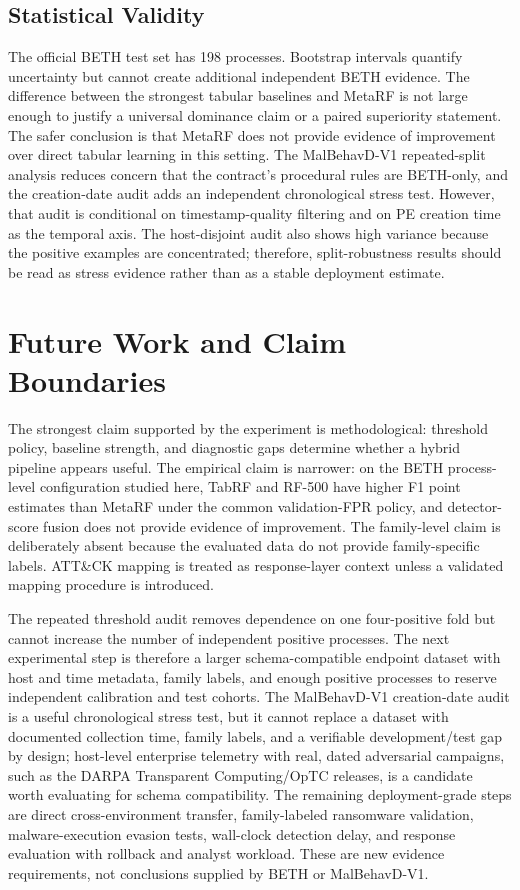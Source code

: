 \documentclass[10pt,journal,compsoc]{IEEEtran}
\begin{document}
\subsection{Statistical Validity}

The official BETH test set has 198 processes. Bootstrap intervals quantify uncertainty but cannot create additional independent BETH evidence. The difference between the strongest tabular baselines and MetaRF is not large enough to justify a universal dominance claim or a paired superiority statement. The safer conclusion is that MetaRF does not provide evidence of improvement over direct tabular learning in this setting. The MalBehavD-V1 repeated-split analysis reduces concern that the contract's procedural rules are BETH-only, and the creation-date audit adds an independent chronological stress test. However, that audit is conditional on timestamp-quality filtering and on PE creation time as the temporal axis. The host-disjoint audit also shows high variance because the positive examples are concentrated; therefore, split-robustness results should be read as stress evidence rather than as a stable deployment estimate.

\section{Future Work and Claim Boundaries}
\label{sec:recommendations}

The strongest claim supported by the experiment is methodological: threshold policy, baseline strength, and diagnostic gaps determine whether a hybrid pipeline appears useful. The empirical claim is narrower: on the BETH process-level configuration studied here, TabRF and RF-500 have higher F1 point estimates than MetaRF under the common validation-FPR policy, and detector-score fusion does not provide evidence of improvement. The family-level claim is deliberately absent because the evaluated data do not provide family-specific labels. ATT\&CK mapping is treated as response-layer context unless a validated mapping procedure is introduced.

The repeated threshold audit removes dependence on one four-positive fold but cannot increase the number of independent positive processes. The next experimental step is therefore a larger schema-compatible endpoint dataset with host and time metadata, family labels, and enough positive processes to reserve independent calibration and test cohorts. The MalBehavD-V1 creation-date audit is a useful chronological stress test, but it cannot replace a dataset with documented collection time, family labels, and a verifiable development/test gap by design; host-level enterprise telemetry with real, dated adversarial campaigns, such as the DARPA Transparent Computing/OpTC releases, is a candidate worth evaluating for schema compatibility. The remaining deployment-grade steps are direct cross-environment transfer, family-labeled ransomware validation, malware-execution evasion tests, wall-clock detection delay, and response evaluation with rollback and analyst workload. These are new evidence requirements, not conclusions supplied by BETH or MalBehavD-V1.
\end{document}
